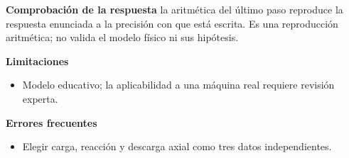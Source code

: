 \documentclass[10pt,openany]{book}
\begin{document}
\begin{tcolorbox}[title={Problema resuelto 1}, studiumworked, breakable]
\noindent\textbf{Comprobación de la respuesta} la aritmética del último paso reproduce la respuesta enunciada a la precisión con que está escrita. Es una reproducción aritmética; no valida el modelo físico ni sus hipótesis.

\noindent\textbf{Limitaciones}
\begin{itemize}
\item Modelo educativo; la aplicabilidad a una máquina real requiere revisión experta.
\end{itemize}

\noindent\textbf{Errores frecuentes}
\begin{itemize}
\item Elegir carga, reacción y descarga axial como tres datos independientes.
\end{itemize}
\end{tcolorbox}
\end{document}

